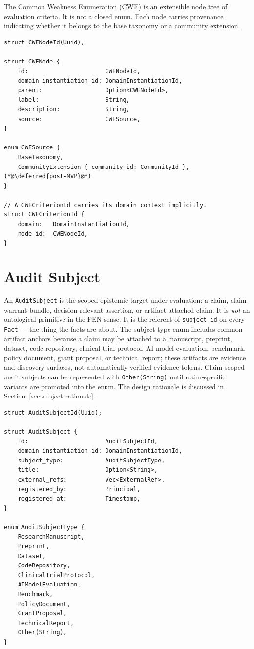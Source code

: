 \documentclass[11pt]{article}
\newcommand{\deferred}[1]{\textcolor{accentgray}{\textit{// deferred: #1}}}
\begin{document}
The Common Weakness Enumeration (CWE) is an extensible node tree of evaluation
criteria. It is not a closed enum. Each node carries provenance indicating
whether it belongs to the base taxonomy or a community extension.

\begin{lstlisting}
struct CWENodeId(Uuid);

struct CWENode {
    id:                      CWENodeId,
    domain_instantiation_id: DomainInstantiationId,
    parent:                  Option<CWENodeId>,
    label:                   String,
    description:             String,
    source:                  CWESource,
}

enum CWESource {
    BaseTaxonomy,
    CommunityExtension { community_id: CommunityId }, (*@\deferred{post-MVP}@*)
}

// A CWECriterionId carries its domain context implicitly.
struct CWECriterionId {
    domain:   DomainInstantiationId,
    node_id:  CWENodeId,
}
\end{lstlisting}

\section{Audit Subject}

An \texttt{AuditSubject} is the scoped epistemic target under evaluation: a
claim, claim-warrant bundle, decision-relevant assertion, or artifact-attached
claim. It is \emph{not} an ontological primitive in the FEN sense. It is the
referent of \texttt{subject\_id} on every \texttt{Fact} --- the thing the facts
are about. The subject type enum includes common artifact anchors because a
claim may be attached to a manuscript, preprint, dataset, code repository,
clinical trial protocol, AI model evaluation, benchmark, policy document, grant
proposal, or technical report; these artifacts are evidence and discovery
surfaces, not automatically verified evidence tokens. Claim-scoped audit
subjects can be represented with \texttt{Other(String)} until claim-specific
variants are promoted into the enum. The design rationale is discussed in
Section~\ref{sec:subject-rationale}.

\begin{lstlisting}
struct AuditSubjectId(Uuid);

struct AuditSubject {
    id:                      AuditSubjectId,
    domain_instantiation_id: DomainInstantiationId,
    subject_type:            AuditSubjectType,
    title:                   Option<String>,
    external_refs:           Vec<ExternalRef>,
    registered_by:           Principal,
    registered_at:           Timestamp,
}

enum AuditSubjectType {
    ResearchManuscript,
    Preprint,
    Dataset,
    CodeRepository,
    ClinicalTrialProtocol,
    AIModelEvaluation,
    Benchmark,
    PolicyDocument,
    GrantProposal,
    TechnicalReport,
    Other(String),
}
\end{lstlisting}
\end{document}
